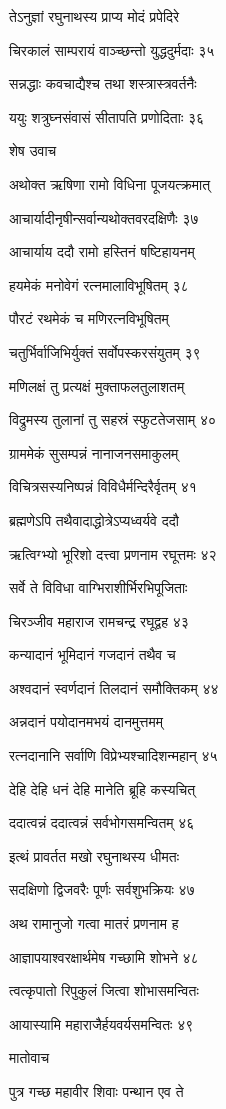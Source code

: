 तेऽनुज्ञां रघुनाथस्य प्राप्य मोदं प्रपेदिरे

चिरकालं साम्परायं वाञ्च्छन्तो युद्धदुर्मदाः ३५

सन्नद्धाः कवचाद्यैश्च तथा शस्त्रास्त्रवर्तनैः

ययुः शत्रुघ्नसंवासं सीतापति प्रणोदिताः ३६

शेष उवाच

अथोक्त ऋषिणा रामो विधिना पूजयत्क्रमात्

आचार्यादीनृषीन्सर्वान्यथोक्तवरदक्षिणैः ३७

आचार्याय ददौ रामो हस्तिनं षष्टिहायनम्

हयमेकं मनोवेगं रत्नमालाविभूषितम् ३८

पौरटं रथमेकं च मणिरत्नविभूषितम्

चतुर्भिर्वाजिभिर्युक्तं सर्वोपस्करसंयुतम् ३९

मणिलक्षं तु प्रत्यक्षं मुक्ताफलतुलाशतम्

विद्रुमस्य तुलानां तु सहस्रं स्फुटतेजसाम् ४०

ग्राममेकं सुसम्पन्नं नानाजनसमाकुलम्

विचित्रसस्यनिष्पन्नं विविधैर्मन्दिरैर्वृतम् ४१

ब्रह्मणेऽपि तथैवादाद्धोत्रेऽप्यध्वर्यवे ददौ

ऋत्विग्भ्यो भूरिशो दत्त्वा प्रणनाम रघूत्तमः ४२

सर्वे ते विविधा वाग्भिराशीर्भिरभिपूजिताः

चिरञ्जीव महाराज रामचन्द्र रघूद्वह ४३

कन्यादानं भूमिदानं गजदानं तथैव च

अश्वदानं स्वर्णदानं तिलदानं समौक्तिकम् ४४

अन्नदानं पयोदानमभयं दानमुत्तमम्

रत्नदानानि सर्वाणि विप्रेभ्यश्चादिशन्महान् ४५

देहि देहि धनं देहि मानेति ब्रूहि कस्यचित्

ददात्वन्नं ददात्वन्नं सर्वभोगसमन्वितम् ४६

इत्थं प्रावर्तत मखो रघुनाथस्य धीमतः

सदक्षिणो द्विजवरैः पूर्णः सर्वशुभक्रियः ४७

अथ रामानुजो गत्वा मातरं प्रणनाम ह

आज्ञापयाश्वरक्षार्थमेष गच्छामि शोभने ४८

त्वत्कृपातो रिपुकुलं जित्वा शोभासमन्वितः

आयास्यामि महाराजैर्हयवर्यसमन्वितः ४९

मातोवाच

पुत्र गच्छ महावीर शिवाः पन्थान एव ते

